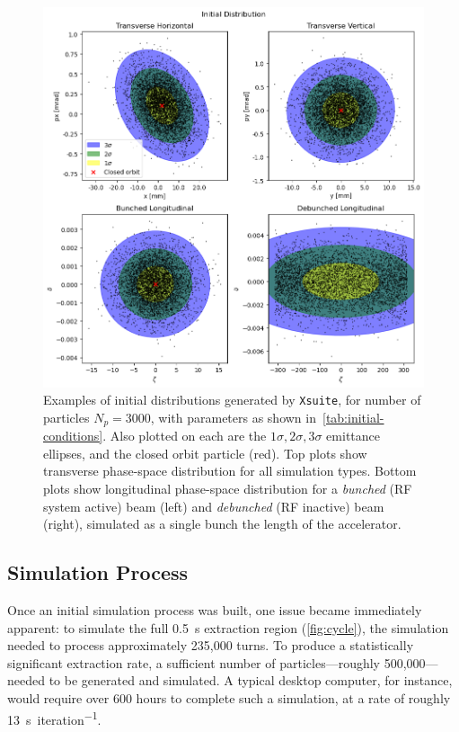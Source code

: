 \documentclass[a4paper,twoside,11pt]{report}
\begin{document}
\begin{figure}
  \centering
  \includegraphics*[width=\linewidth]{initial-dist.png}
  \cprotect\caption[Initial particle distributions generated by \verb|Xsuite|]{Examples of initial distributions generated by \verb|Xsuite|, for number of particles $N_p=3000$, with parameters as shown in~\autoref{tab:initial-conditions}. Also plotted on each are the $1\sigma, 2\sigma, 3\sigma$ emittance ellipses, and the closed orbit particle (red). Top plots show transverse phase-space distribution for all simulation types. Bottom plots show longitudinal phase-space distribution for a \textit{bunched} (RF system active) beam (left) and \textit{debunched} (RF inactive) beam (right), simulated as a single bunch the length of the accelerator.}\label{fig:initial-dist}
\end{figure}

\subsection{Simulation Process}\label{sec:sim_process}

Once an initial simulation process was built, one issue became immediately apparent: to simulate the full \qty{0.5}{\second} extraction region (\autoref{fig:cycle}), the simulation needed to process approximately 235,000 turns. To produce a statistically significant extraction rate, a sufficient number of particles---roughly 500,000---needed to be generated and simulated. A typical desktop computer, for instance, would require over 600 hours to complete such a simulation, at a rate of roughly \qty{13}{\second\per iteration}.
\end{document}
